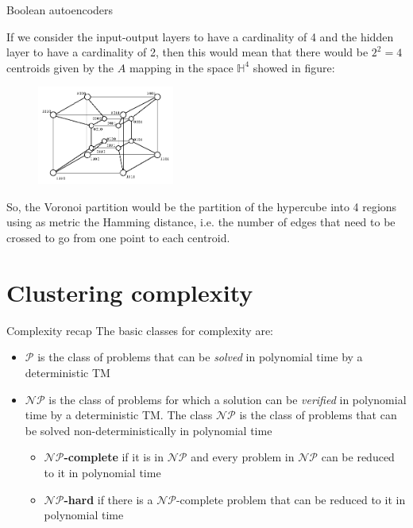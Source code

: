 \documentclass[9pt]{beamer}
\begin{document}
\begin{frame}{Boolean autoencoders}
    \begin{multicols}{2}
        If we consider the input-output layers to have a cardinality of 4 and the hidden layer to have a cardinality of 2, then this would mean that there would be $2^2 = 4$ centroids given by the $A$ mapping in the space $\mathbb{H}^4$ showed in figure:

        \begin{figure}[H]
            \centering
            \includegraphics[width=0.4\textwidth]{./Images/Hypercube4Dimensions.png}
        \end{figure}
    \end{multicols}
    So, the Voronoi partition would be the partition of the hypercube into 4 regions using as metric the Hamming distance, i.e. the number of edges that need to be crossed to go from one point to each centroid.

\end{frame}

\section{Clustering complexity}
\begin{frame}{Complexity recap}
The basic classes for complexity are:
\begin{itemize}
    \item $\mathcal{P}$ is the class of problems that can be \textit{solved} in polynomial time by a deterministic TM
    \item $\mathcal{NP}$ is the class of problems for which a solution can be \textit{verified} in polynomial time by a deterministic TM. The class $\mathcal{NP}$ is the class of problems that can be solved non-deterministically in polynomial time
    \begin{itemize}
        \item \textbf{$\mathcal{NP}$-complete} if it is in $\mathcal{NP}$ and every problem in $\mathcal{NP}$ can be reduced to it in polynomial time
        \item \textbf{$\mathcal{NP}$-hard} if there is a $\mathcal{NP}$-complete problem that can be reduced to it in polynomial time
    \end{itemize}
\end{itemize}
\end{frame}
\end{document}
